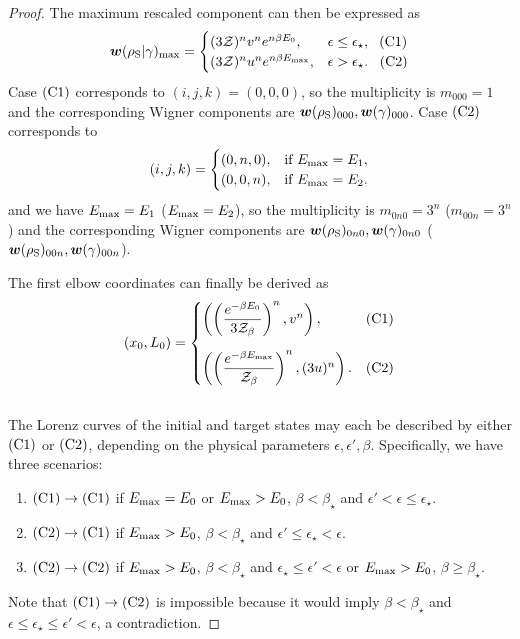 \documentclass[pra,
aps,
twocolumn,
superscriptaddress,
groupedaddress,
nofootinbib,
reprint
]{revtex4-1}
\begin{document}
\begin{proof}
The maximum rescaled component can then be expressed as
\begin{equation}
\bm{w}(\rho_{\rm{S}} | \gamma)_{\rm{max}} =
	\begin{cases}
		(3\mathcal{Z})^{n} v^n e^{n\beta E_0}, &\epsilon \leq \epsilon_{\star},\ \hspace{3pt}\rm{(C1)}	\\
		(3\mathcal{Z})^{n} u^n e^{n\beta E_{\rm{max}}}, &\epsilon > \epsilon_{\star}.\ \hspace{5pt}\rm{(C2)} 
	\end{cases}
\end{equation}
Case $\rm{(C1)}$ corresponds to $(i,j,k) = (0,0,0)$, so the multiplicity is $m_{000} = 1$ and the corresponding Wigner components are $\bm{w}(\rho_{\rm{S}})_{000}, \bm{w}(\gamma)_{000}$. 
Case $\rm{(C2)}$ corresponds to
\begin{equation}
	(i,j,k) = 
	\begin{cases}
	(0,n,0), &\text{if } E_{\rm{max}} = E_1, \\
	(0,0,n), &\text{if } E_{\rm{max}} = E_2.
	\end{cases}
\end{equation}
and we have $E_{\rm{max}} = E_1$ ($E_{\rm{max}} = E_2$), so the multiplicity is $m_{0n0} = 3^n$ ($m_{00n} = 3^n$) and the corresponding Wigner components are $\bm{w}(\rho_{\rm{S}})_{0n0}, \bm{w}(\gamma)_{0n0}$ ($\bm{w}(\rho_{\rm{S}})_{00n}, \bm{w}(\gamma)_{00n}$).

The first elbow coordinates can finally be derived as
\begin{equation}\label{eq:first_elb_coords}
	(x_0, L_0) =
	\begin{cases}
		\left( \left(\dfrac{e^{-\beta E_0}}{3\Z_\beta}\right)^n, v^n \right), &\rm{(C1)}	\vspace{10pt}\\
		\left( \left(\dfrac{e^{-\beta E_{\rm{max}}}}{\Z_\beta}\right)^n, (3u)^n \right). &\rm{(C2)} 
	\end{cases}
\end{equation}
\null\\

The Lorenz curves of the initial and target states may each be described by either $\rm{(C1)}$ or $\rm{(C2)}$, depending on the physical parameters $\epsilon, \epsilon', \beta$.
Specifically, we have three scenarios:
\begin{enumerate}
	\item $\rm{(C1)} \rightarrow \rm{(C1)}$ if $E_{\rm{max}} = E_0$ or $E_{\rm{max}} > E_0$, $\beta < \beta_{\star}$ and $\epsilon' < \epsilon  \leq \epsilon_{\star}$.
	\item $\rm{(C2)} \rightarrow \rm{(C1)}$ if $E_{\rm{max}} > E_0$, $\beta < \beta_{\star}$ and $\epsilon' \leq \epsilon_{\star} < \epsilon$.
	\item $\rm{(C2)} \rightarrow \rm{(C2)}$ if $E_{\rm{max}} > E_0$, $\beta < \beta_{\star}$ and $\epsilon_{\star} \leq \epsilon' < \epsilon$ or $E_{\rm{max}} > E_0$, $\beta \geq \beta_{\star}$.
\end{enumerate}
Note that $\rm{(C1)} \rightarrow \rm{(C2)}$ is impossible because it would imply $\beta < \beta_{\star}$ and $\epsilon \leq \epsilon_{\star} \leq \epsilon' < \epsilon$, a contradiction.


\end{proof}
\end{document}
